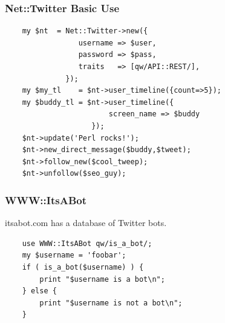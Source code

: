 \documentclass[12pt]{beamer}
\begin{document}
\begin{frame}[fragile]
    \frametitle{Net::Twitter Basic Use}
    \begin{small}
    \begin{verbatim}
    my $nt  = Net::Twitter->new({
                 username => $user,
                 password => $pass,
                 traits   => [qw/API::REST/],
              });
    my $my_tl    = $nt->user_timeline({count=>5});
    my $buddy_tl = $nt->user_timeline({
                        screen_name => $buddy
                    });
    $nt->update('Perl rocks!');
    $nt->new_direct_message($buddy,$tweet);
    $nt->follow_new($cool_tweep);
    $nt->unfollow($seo_guy);

    \end{verbatim}
    \end{small}
\end{frame}



\begin{frame}[fragile]
    \frametitle{WWW::ItsABot}
    itsabot.com has a database of Twitter bots.
    \begin{verbatim}
    use WWW::ItsABot qw/is_a_bot/;
    my $username = 'foobar';
    if ( is_a_bot($username) ) {
        print "$username is a bot\n";
    } else {
        print "$username is not a bot\n";
    }
    \end{verbatim}

\end{frame}



\end{document}
